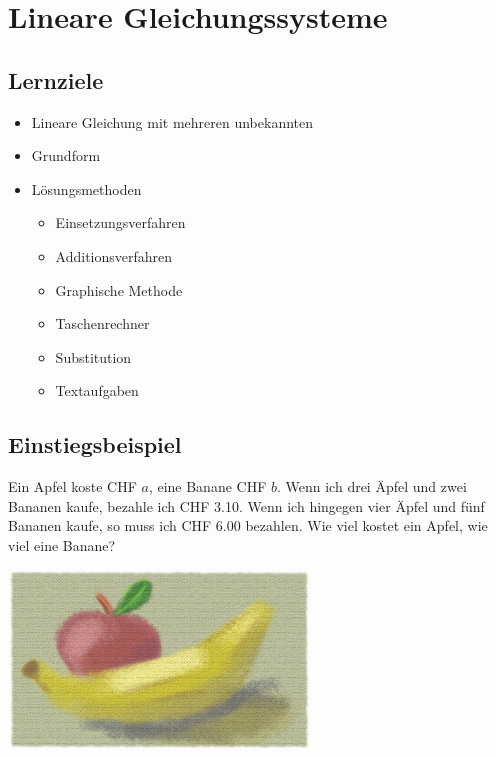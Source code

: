 \section{Lineare Gleichungssysteme}

\subsection*{Lernziele}
\begin{itemize}
	\item{Lineare Gleichung mit mehreren unbekannten}
	\item{Grundform}
	\item{Lösungsmethoden}
	\begin{itemize}
		\item{Einsetzungsverfahren}
		\item{Additionsverfahren}
		\item{Graphische Methode}
		\item{Taschenrechner}
		\item{Substitution}
    \item Textaufgaben
	\end{itemize}

\end{itemize}

\newpage

\subsection{Einstiegsbeispiel}
Ein Apfel koste CHF $a$, eine Banane CHF $b$. Wenn ich drei Äpfel und zwei Bananen kaufe, bezahle ich CHF 3.10. Wenn ich hingegen vier Äpfel und fünf Bananen kaufe, so muss ich CHF 6.00 bezahlen. Wie viel kostet ein Apfel, wie viel eine Banane?

\begin{center}\includegraphics[width=8cm]{allg/gls/img/ApfelBanane.jpg}\end{center}

